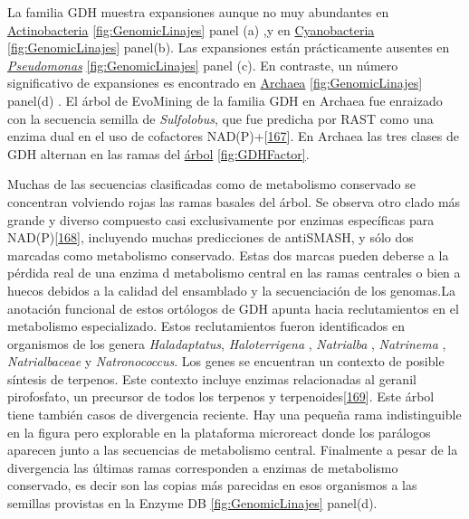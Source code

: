 \documentclass[12pt,twoside]{reedthesis}
\begin{document}
  La familia GDH muestra expansiones aunque no muy abundantes en
  \href{https://microreact.org/project/r1IhjVm6X?tt=cr}{Actinobacteria}
  \autoref{fig:GenomicLinajes} panel (a) ,y en
  \href{https://microreact.org/project/HyjYUN7pQ?tt=cr}{Cyanobacteria}
  \autoref{fig:GenomicLinajes} panel(b). Las expansiones están
  prácticamente ausentes en
  \href{https://microreact.org/project/HyjYUN7pQ?tt=cr}{\emph{Pseudomonas}}
  \autoref{fig:GenomicLinajes} panel (c). En contraste, un número
  significativo de expansiones es encontrado en
  \href{https://microreact.org/project/ByUcvNmaX?tt=cr}{Archaea}
  \autoref{fig:GenomicLinajes} panel(d) . El árbol de EvoMining de la
  familia GDH en Archaea fue enraizado con la secuencia semilla de
  \emph{Sulfolobus}, que fue predicha por RAST como una enzima dual en el
  uso de cofactores
  NAD(P)+{[}\protect\hyperlink{ref-consalvi_glutamate_1991}{167}{]}. En
  Archaea las tres clases de GDH alternan en las ramas del
  \href{https://microreact.org/project/ByUcvNmaX?tt=cr}{árbol}
  \autoref{fig:GDHFactor}.
  
  Muchas de las secuencias clasificadas como de metabolismo conservado se
  concentran volviendo rojas las ramas basales del árbol. Se observa otro
  clado más grande y diverso compuesto casi exclusivamente por enzimas
  específicas para
  NAD(P){[}\protect\hyperlink{ref-ferrer_nadp-glutamate_1996}{168}{]},
  incluyendo muchas predicciones de antiSMASH, y sólo dos marcadas como
  metabolismo conservado. Estas dos marcas pueden deberse a la pérdida
  real de una enzima d metabolismo central en las ramas centrales o bien a
  huecos debidos a la calidad del ensamblado y la secuenciación de los
  genomas.La anotación funcional de estos ortólogos de GDH apunta hacia
  reclutamientos en el metabolismo especializado. Estos reclutamientos
  fueron identificados en organismos de los genera \emph{Haladaptatus},
  \emph{Haloterrigena} , \emph{Natrialba} , \emph{Natrinema} ,
  \emph{Natrialbaceae} y \emph{Natronococcus}. Los genes se encuentran un
  contexto de posible síntesis de terpenos. Este contexto incluye enzimas
  relacionadas al geranil pirofosfato, un precursor de todos los terpenos
  y terpenoides{[}\protect\hyperlink{ref-tholl_terpene_2006}{169}{]}. Este
  árbol tiene también casos de divergencia reciente. Hay una pequeña rama
  indistinguible en la figura pero explorable en la plataforma microreact
  donde los parálogos aparecen junto a las secuencias de metabolismo
  central. Finalmente a pesar de la divergencia las últimas ramas
  corresponden a enzimas de metabolismo conservado, es decir son las
  copias más parecidas en esos organismos a las semillas provistas en la
  Enzyme DB \autoref{fig:GenomicLinajes} panel(d).
  
\end{document}

